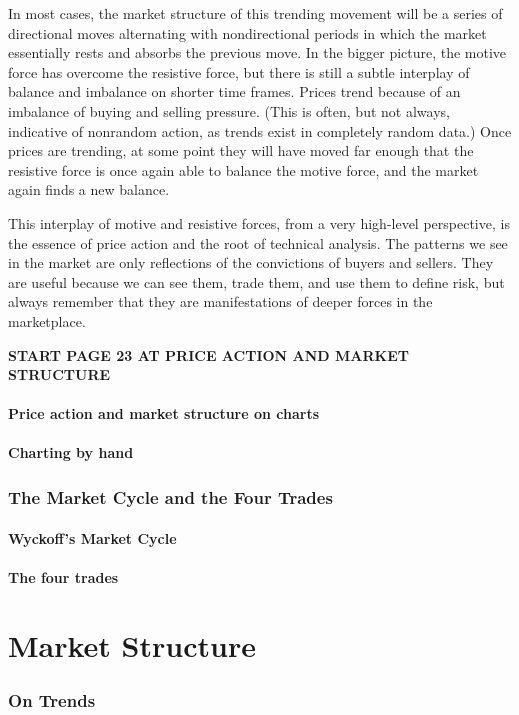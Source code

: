 \documentclass[10pt,twocolumn]{article}
\begin{document}
In most cases, the market structure of this trending movement will be a series of directional moves alternating with nondirectional periods in which the market essentially rests and absorbs the previous move. In the bigger picture, the motive force has overcome the resistive force, but there is still a subtle interplay of balance and imbalance on shorter time frames. Prices trend because of an imbalance of buying and selling pressure. (This is often, but not always, indicative of nonrandom action, as trends exist in completely random data.) Once prices are trending, at some point they will have moved far enough that the resistive force is once again able to balance the motive force, and the market again finds a new balance.

This interplay of motive and resistive forces, from a very high-level perspective, is the essence of price action and the root of technical analysis. The patterns we see in the market are only reflections of the convictions of buyers and sellers. They are useful because we can see them, trade them, and use them to define risk, but always remember that they are manifestations of deeper forces in the marketplace.

\textbf{START PAGE 23 AT PRICE ACTION AND MARKET STRUCTURE}
\subsection{Price action and market structure on charts}

\subsection{Charting by hand}

\section{The Market Cycle and the Four Trades}
\subsection{Wyckoff's Market Cycle}
\subsection{The four trades}

\part{Market Structure}
\section{On Trends}
\end{document}
